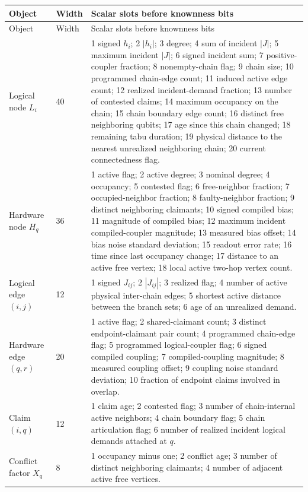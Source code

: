 \begin{longtable}{@{}p{}p{}p{}@{}}
\toprule
Object & Width & Scalar slots before knownness bits \\
\midrule
\endfirsthead
\toprule Object & Width & Scalar slots before knownness bits \\
\midrule
\endhead
Logical node \(L_i\) & 40 &
1 signed \(h_i\); 2 \(|h_i|\); 3 degree; 4 sum of incident \(|J|\); 5 maximum incident \(|J|\); 6 signed incident sum; 7 positive-coupler fraction; 8 nonempty-chain flag; 9 chain size; 10 programmed chain-edge count; 11 induced active edge count; 12 realized incident-demand fraction; 13 number of contested claims; 14 maximum occupancy on the chain; 15 chain boundary edge count; 16 distinct free neighboring qubits; 17 age since this chain changed; 18 remaining tabu duration; 19 physical distance to the nearest unrealized neighboring chain; 20 current connectedness flag. \\
\addlinespace
Hardware node \(H_q\) & 36 &
1 active flag; 2 active degree; 3 nominal degree; 4 occupancy; 5 contested flag; 6 free-neighbor fraction; 7 occupied-neighbor fraction; 8 faulty-neighbor fraction; 9 distinct neighboring claimants; 10 signed compiled bias; 11 magnitude of compiled bias; 12 maximum incident compiled-coupler magnitude; 13 measured bias offset; 14 bias noise standard deviation; 15 readout error rate; 16 time since last occupancy change; 17 distance to an active free vertex; 18 local active two-hop vertex count. \\
\addlinespace
Logical edge \((i,j)\) & 12 &
1 signed \(J_{ij}\); 2 \(|J_{ij}|\); 3 realized flag; 4 number of active physical inter-chain edges; 5 shortest active distance between the branch sets; 6 age of an unrealized demand. \\
\addlinespace
Hardware edge \((q,r)\) & 20 &
1 active flag; 2 shared-claimant count; 3 distinct endpoint-claimant pair count; 4 programmed chain-edge flag; 5 programmed logical-coupler flag; 6 signed compiled coupling; 7 compiled-coupling magnitude; 8 measured coupling offset; 9 coupling noise standard deviation; 10 fraction of endpoint claims involved in overlap. \\
\addlinespace
Claim \((i,q)\) & 12 &
1 claim age; 2 contested flag; 3 number of chain-internal active neighbors; 4 chain boundary flag; 5 chain articulation flag; 6 number of realized incident logical demands attached at \(q\). \\
\addlinespace
Conflict factor \(X_q\) & 8 &
1 occupancy minus one; 2 conflict age; 3 number of distinct neighboring claimants; 4 number of adjacent active free vertices. \\
\bottomrule
\end{longtable}


